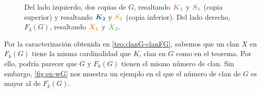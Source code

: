 \begin{figure}[ht!]
\caption{Del lado izquierdo, dos copias de $G$, resaltando
${\color{salmon}\boldsymbol {K_1}}$ y ${\color{baige}\boldsymbol {S_1}}$ (copia
superior) y resaltando ${\color{azulOscuro}\boldsymbol {K_2}}$ y
${\color{oro}\boldsymbol {S_2}}$ (copia inferior). Del lado derecho, $F_3(G)$,
resaltando ${\color{naranja}\boldsymbol {X_1}}$ y ${\color{verde}\boldsymbol
{X_2}}$.}
\label{fig:ex-clique2}
\end{figure}
       
Por la caracterizaci\'on obtenida en \cref{teo:clanG-clanFG}, sabemos que un
clan $X$ en $F_k(G)$ tiene la misma cardinalidad que $K$, clan en $G$ como en el
teorema. Por ello, podr\'ia parecer que $G$ y $F_k(G)$ tienen el mismo n\'umero
de clan. Sin embargo, \cref{fig:ex-wG} nos muestra un ejemplo en el que el
n\'umero de clan de $G$ es mayor al de $F_k(G)$.


